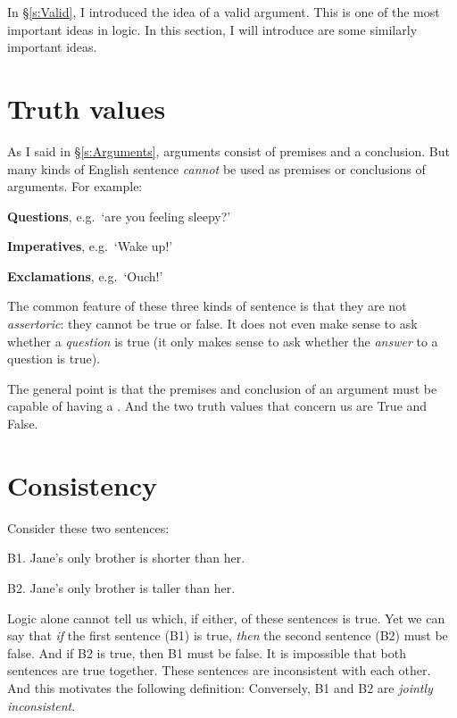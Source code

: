 In \S\ref{s:Valid}, I introduced the idea of a valid argument. This is one of the most important ideas in logic. In this section, I will introduce are some similarly important ideas. 

\section{Truth values}
As I said in \S\ref{s:Arguments}, arguments consist of premises and a conclusion. But many kinds of English sentence \emph{cannot} be used as premises or conclusions of arguments. For example:
	\begin{ebullet}
		\item \textbf{Questions}, e.g.\ `are you feeling sleepy?'
		\item \textbf{Imperatives}, e.g.\ `Wake up!'
		\item \textbf{Exclamations}, e.g.\ `Ouch!'
	\end{ebullet}
The common feature of these three kinds of sentence is that they are not \emph{assertoric}: they cannot be true or false. It does not even make sense to ask whether a \emph{question} is true (it only makes sense to ask whether the \emph{answer} to a question is true).

The general point is that the premises and conclusion of an argument must be capable of having a . And the two truth values that concern us are True and False. 



\section{Consistency}
Consider these two sentences:
	\begin{ebullet}
		\item[B1.] Jane's only brother is shorter than her.
		\item[B2.] Jane's only brother is taller than her.
	\end{ebullet}
Logic alone cannot tell us which, if either, of these sentences is true. Yet we can say that \emph{if} the first sentence (B1) is true, \emph{then} the second sentence (B2) must be false. And if B2 is true, then B1 must be false. It is impossible that both sentences are true together. These sentences are inconsistent with each other. And this motivates the following definition:
Conversely, B1 and B2 are \emph{jointly inconsistent}.

